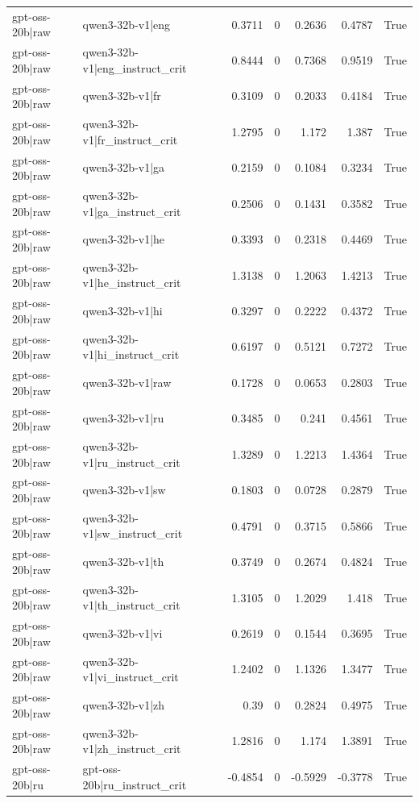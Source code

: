 \begin{table}
\begin{tabular}{l l r r r r l}
gpt-oss-20b|raw & qwen3-32b-v1|eng & 0.3711 & 0 & 0.2636 & 0.4787 & True \\
gpt-oss-20b|raw & qwen3-32b-v1|eng_instruct_crit & 0.8444 & 0 & 0.7368 & 0.9519 & True \\
gpt-oss-20b|raw & qwen3-32b-v1|fr & 0.3109 & 0 & 0.2033 & 0.4184 & True \\
gpt-oss-20b|raw & qwen3-32b-v1|fr_instruct_crit & 1.2795 & 0 & 1.172 & 1.387 & True \\
gpt-oss-20b|raw & qwen3-32b-v1|ga & 0.2159 & 0 & 0.1084 & 0.3234 & True \\
gpt-oss-20b|raw & qwen3-32b-v1|ga_instruct_crit & 0.2506 & 0 & 0.1431 & 0.3582 & True \\
gpt-oss-20b|raw & qwen3-32b-v1|he & 0.3393 & 0 & 0.2318 & 0.4469 & True \\
gpt-oss-20b|raw & qwen3-32b-v1|he_instruct_crit & 1.3138 & 0 & 1.2063 & 1.4213 & True \\
gpt-oss-20b|raw & qwen3-32b-v1|hi & 0.3297 & 0 & 0.2222 & 0.4372 & True \\
gpt-oss-20b|raw & qwen3-32b-v1|hi_instruct_crit & 0.6197 & 0 & 0.5121 & 0.7272 & True \\
gpt-oss-20b|raw & qwen3-32b-v1|raw & 0.1728 & 0 & 0.0653 & 0.2803 & True \\
gpt-oss-20b|raw & qwen3-32b-v1|ru & 0.3485 & 0 & 0.241 & 0.4561 & True \\
gpt-oss-20b|raw & qwen3-32b-v1|ru_instruct_crit & 1.3289 & 0 & 1.2213 & 1.4364 & True \\
gpt-oss-20b|raw & qwen3-32b-v1|sw & 0.1803 & 0 & 0.0728 & 0.2879 & True \\
gpt-oss-20b|raw & qwen3-32b-v1|sw_instruct_crit & 0.4791 & 0 & 0.3715 & 0.5866 & True \\
gpt-oss-20b|raw & qwen3-32b-v1|th & 0.3749 & 0 & 0.2674 & 0.4824 & True \\
gpt-oss-20b|raw & qwen3-32b-v1|th_instruct_crit & 1.3105 & 0 & 1.2029 & 1.418 & True \\
gpt-oss-20b|raw & qwen3-32b-v1|vi & 0.2619 & 0 & 0.1544 & 0.3695 & True \\
gpt-oss-20b|raw & qwen3-32b-v1|vi_instruct_crit & 1.2402 & 0 & 1.1326 & 1.3477 & True \\
gpt-oss-20b|raw & qwen3-32b-v1|zh & 0.39 & 0 & 0.2824 & 0.4975 & True \\
gpt-oss-20b|raw & qwen3-32b-v1|zh_instruct_crit & 1.2816 & 0 & 1.174 & 1.3891 & True \\
gpt-oss-20b|ru & gpt-oss-20b|ru_instruct_crit & -0.4854 & 0 & -0.5929 & -0.3778 & True \\

\end{tabular}
\end{table}
